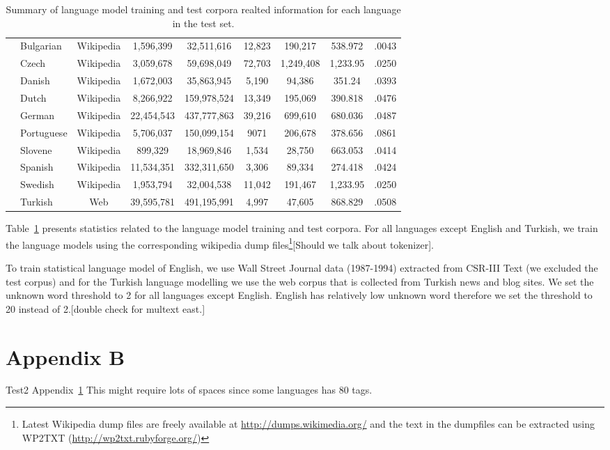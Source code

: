 \begin{table}[h]
\begin{tabular}{l|l|c|c|c|c|c|c|c|}
    &Bulgarian& Wikipedia &1,596,399 & 32,511,616  & 12,823 & 190,217 & 538.972 & .0043\\
    &Czech & Wikipedia &3,059,678 & 59,698,049 & 72,703 & 1,249,408 & 1,233.95 &.0250\\
    &Danish & Wikipedia &1,672,003 & 35,863,945 & 5,190 & 94,386 & 351.24 & .0393\\
    &Dutch & Wikipedia &8,266,922 & 159,978,524 & 13,349 & 195,069 & 390.818 & .0476\\
    &German & Wikipedia &22,454,543&437,777,863 & 39,216 & 699,610 & 680.036 & .0487\\
    &Portuguese & Wikipedia & 5,706,037 & 150,099,154 & 9071 & 206,678 & 378.656 & .0861\\
    &Slovene & Wikipedia & 899,329 & 18,969,846 & 1,534 & 28,750 & 663.053 & .0414\\
    &Spanish & Wikipedia &11,534,351 & 332,311,650& 3,306 & 89,334 & 274.418 & .0424\\
    &Swedish & Wikipedia &1,953,794 & 32,004,538& 11,042 & 191,467 & 1,233.95 & .0250\\
    &Turkish & Web &39,595,781 & 491,195,991& 4,997 & 47,605 & 868.829 & .0508\\
    \hline
  \end{tabular}
  \caption{Summary of language model training and test corpora
  realted information for each language in the test set.}
  \label{tab:lmstatistics}
\end{table}

\noindent Table~\ref{tab:lmstatistics} presents statistics related to the
language model training and test corpora.  For all languages except
English and Turkish, we train the language models using the
corresponding wikipedia dump files\footnote{Latest Wikipedia dump
files are freely available at \url{http://dumps.wikimedia.org/} and
the text in the dumpfiles can be extracted using WP2TXT
(\url{http://wp2txt.rubyforge.org/})}[Should we talk about tokenizer].

To train statistical language model of English, we use Wall Street
Journal data (1987-1994) extracted from CSR-III Text \cite{csr3text}
(we excluded the test corpus) and for the Turkish language modelling
we use the web corpus that is collected from Turkish news and blog
sites\cite{sak2008turkish}.  We set the unknown word threshold to 2
for all languages except English.  English has relatively low unknown
word therefore we set the threshold to 20 instead of 2.[double check
for multext east.]

\section{Appendix B}
\label{app:tags}
Test2 Appendix~\ref{app:tags} This might require lots of spaces since
some languages has 80 tags.
